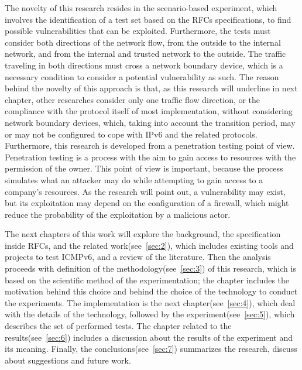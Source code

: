 \documentclass[12pt]{article}
\begin{document}
The novelty of this research resides in the scenario-based experiment, which involves the identification of a test set based on the RFCs specifications, to find possible vulnerabilities that can be exploited. Furthermore, the tests must consider both directions of the network flow, from the outside to the internal network, and from the internal and trusted network to the outside. The traffic traveling in both directions must cross a network boundary device, which is a necessary condition to consider a potential vulnerability as such. The reason behind the novelty of this approach is that, as this research will underline in next chapter, other researches consider only one traffic flow direction, or the compliance with the protocol itself of most implementation, without considering network boundary devices, which, taking into account the transition period, may or may not be configured to cope with IPv6 and the related protocols. Furthermore, this research is developed from a penetration testing point of view. Penetration testing is a process with the aim to gain access to resources with the permission of the owner\cite{penTesting}. This point of view is important, because the process simulates what an attacker may do while attempting to gain access to a company's resources. As the research will point out, a vulnerability may exist, but its exploitation may depend on the configuration of a firewall, which might reduce the probability of the exploitation by a malicious actor.

The next chapters of this work will explore the background, the specification inside RFCs, and the related work(see~\ref{sec:2}), which includes existing tools and projects to test ICMPv6, and a review of the literature. Then the analysis proceeds with definition of the methodology(see~\ref{sec:3}) of this research, which is based on the scientific method of the experimentation; the chapter includes the motivation behind this choice and behind the choice of the technology to conduct the experiments. The implementation is the next chapter(see~\ref{sec:4}), which deal with the details of the technology, followed by the experiment(see~\ref{sec:5}), which describes the set of performed tests. The chapter related to the results(see~\ref{sec:6}) includes a discussion about the results of the experiment and its meaning. Finally, the conclusions(see~\ref{sec:7}) summarizes the research, discuss about suggestions and future work.

 

\pagebreak
\end{document}
